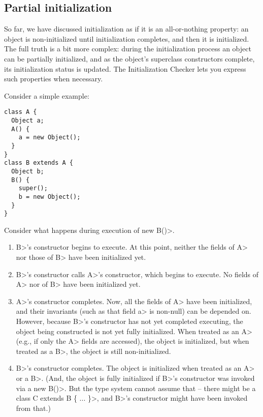 \subsection{Partial initialization\label{partial-initialization}}

So far, we have discussed initialization as if it is an all-or-nothing property:
an object is non-initialized until initialization completes, and then it is initialized.  The full truth is a bit more complex:  during the
initialization process an object can be partially initialized, and as the
object's superclass constructors complete, its initialization status is updated.  The
Initialization Checker lets you express such properties when necessary.

Consider a simple example:

\begin{Verbatim}
class A {
  Object a;
  A() {
    a = new Object();
  }
}
class B extends A {
  Object b;
  B() {
    super();
    b = new Object();
  }
}
\end{Verbatim}

Consider what happens during execution of \<new B()>.

\begin{enumerate}
\item \<B>'s constructor begins to execute.  At this point, neither the
  fields of \<A> nor those of \<B> have been initialized yet.
\item \<B>'s constructor calls \<A>'s constructor, which begins to execute.
  No fields of \<A> nor of \<B> have been initialized yet.
\item \<A>'s constructor completes.  Now, all the fields of \<A> have been
  initialized, and their invariants (such as that field \<a> is non-null) can be
  depended on.  However, because \<B>'s constructor has not yet completed
  executing, the object being constructed is not yet fully initialized.
  When treated as an \<A> (e.g., if only the \<A> fields are accessed), the
  object is initialized, but when treated as a \<B>, the object
  is still non-initialized.
\item \<B>'s constructor completes.  The object is initialized when treated
  as an \<A> or a \<B>.  (And, the object is fully initialized
   if \<B>'s constructor was invoked via a \<new B()>.  But the type system
   cannot assume that -- there might be a \<class C extends B \{
  ... \}>, and \<B>'s constructor might have been invoked from that.)
\end{enumerate}

